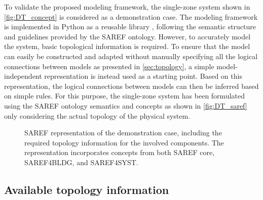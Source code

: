 To validate the proposed modeling framework, the single-zone system shown in \autoref{fig:DT_concept} is considered as a demonstration case. 
The modeling framework is implemented in Python as a reusable library \cite{EMF}, following the semantic structure and guidelines provided by the SAREF ontology. However, to accurately model the system, basic topological information is required. To ensure that the model can easily be constructed and adapted without manually specifying all the logical connections between models as presented in \autoref{sec:topology}, a simple model-independent representation is instead used as a starting point. Based on this representation, the logical connections between models can then be inferred based on simple rules. For this purpose, the single-zone system has been formulated using the SAREF ontology semantics and concepts as shown in \autoref{fig:DT_saref} only considering the actual topology of the physical system.

\begin{figure*}[t!]
    \centering
    
    \caption{SAREF representation of the demonstration case, including the required topology information for the involved components. The representation incorporates concepts from both SAREF core, SAREF4BLDG, and SAREF4SYST.}
    \label{fig:DT_saref}
\end{figure*}

\subsection{Available topology information}

